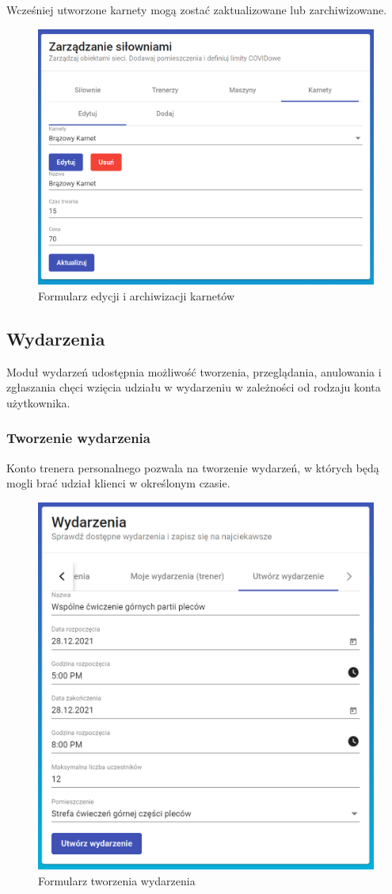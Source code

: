 \documentclass[a4paper,twoside,12pt]{book}
\begin{document}
{Wcześniej utworzone karnety mogą zostać zaktualizowane lub zarchiwizowane.
\begin{figure}[h!]
	\centering
	\includegraphics[width=0.8\linewidth]{../zrzuty_ekranu/dzialanie/karnety/edycja_karnetu}
	\caption{Formularz edycji i archiwizacji karnetów}
	\label{fig:edycjakarnetu}
\end{figure}
\FloatBarrier

\subsection{Wydarzenia}
Moduł wydarzeń udostępnia możliwość tworzenia, przeglądania, anulowania i zgłaszania chęci wzięcia udziału w wydarzeniu w zależności od rodzaju konta użytkownika.
\subsubsection{Tworzenie wydarzenia}
Konto trenera personalnego pozwala na tworzenie wydarzeń, w których będą mogli brać udział klienci w określonym czasie.
\begin{figure}[h!]
	\centering
	\includegraphics[width=0.8\linewidth]{../zrzuty_ekranu/dzialanie/wydarzenia/dodawanie_wydarzenia}
	\caption{Formularz tworzenia wydarzenia}
	\label{fig:dodawaniewydarzenia}
\end{figure}
\FloatBarrier

}
\end{document}
